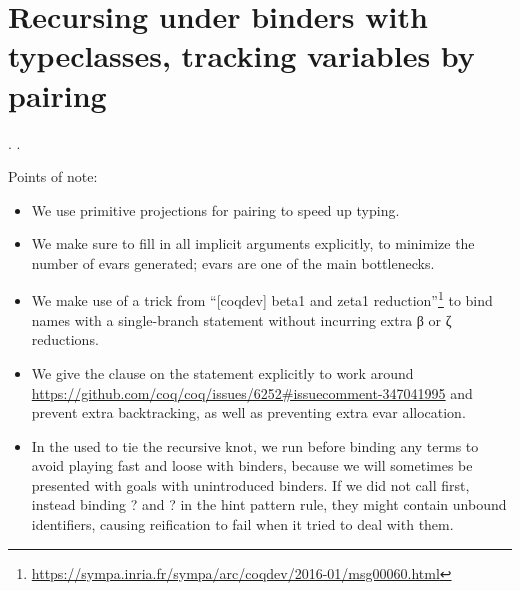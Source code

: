 \begin{coqdoccode}
\end{coqdoccode}
\section{Recursing under binders with typeclasses, tracking variables by pairing}

\begin{coqdoccode}
\coqdocnoindent
{}  .\coqdoceol
\coqdocnoindent
{}  .\coqdoceol
\coqdocemptyline
\end{coqdoccode}
Points of note:



\begin{itemize}
\item  We use primitive projections for pairing to speed up typing.



\item  We make sure to fill in all implicit arguments explicitly, to
      minimize the number of evars generated; evars are one of the
      main bottlenecks.



\item  We make use of a trick from ``[coqdev] beta1 and zeta1
      reduction''\footnote{\url{https://sympa.inria.fr/sympa/arc/coqdev/2016-01/msg00060.html}}
      to bind names with a single-branch  statement without
      incurring extra β or ζ reductions.



\item  We give the  clause on the  statement explicitly
      to work around
      \url{https://github.com/coq/coq/issues/6252\#issuecomment-347041995}
      and prevent extra backtracking, as well as preventing extra evar
      allocation.



\item  In the  used to tie the recursive knot, we run 
      before binding any terms to avoid playing fast and loose with
      binders, because we will sometimes be presented with goals with
      unintroduced binders.  If we did not call  first,
      instead binding ? and ? in the hint pattern rule,
      they might contain unbound identifiers, causing reification to
      fail when it tried to deal with them. 
\end{itemize}
